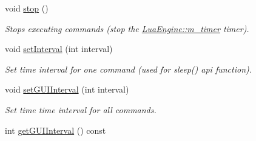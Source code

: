 \begin{DoxyCompactItemize}
void \hyperlink{class_lua_engine_a5822af655fb7b474766e39b44be56a6a}{stop} ()
\begin{DoxyCompactList}\small\item\em Stops executing commands (stop the \hyperlink{class_lua_engine_a367284a1461c5a2d2804c3f9b4d94f14}{Lua\-Engine\-::m\-\_\-timer} timer). \end{DoxyCompactList}\item 
void \hyperlink{class_lua_engine_a0b87a8b474070665af6e435a2c5bce56}{set\-Interval} (int interval)
\begin{DoxyCompactList}\small\item\em Set time interval for one command (used for sleep() api function). \end{DoxyCompactList}\item 
void \hyperlink{class_lua_engine_ac29f2b09b45797aac68bd5caa6fe2c90}{set\-G\-U\-I\-Interval} (int interval)
\begin{DoxyCompactList}\small\item\em Set time time interval for all commands. \end{DoxyCompactList}\item 
int \hyperlink{class_lua_engine_a613b53ffedc45c8cf800e99aa42408c5}{get\-G\-U\-I\-Interval} () const 
\end{DoxyCompactItemize}
